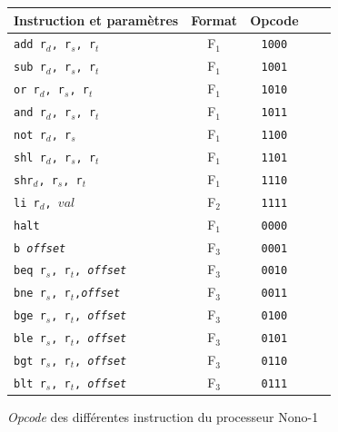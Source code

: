\documentclass[a4paper]{article}
\begin{document}
			\begin{figure}
			\centering
			\begin{tabular}{|p{4cm}|c|c|c|c|}
				\hline Instruction et paramètres & Format & Opcode  \\ 
				\hline \texttt{add r$_{d}$, r$_{s}$, r$_{t}$} & F$_{1}$ & \texttt{1000} \\ 
				\hline \texttt{sub r$_{d}$, r$_{s}$, r$_{t}$} & F$_{1}$ & \texttt{1001}  \\ 
				\hline \texttt{or r$_{d}$, r$_{s}$, r$_{t}$} & F$_{1}$ & \texttt{1010}  \\ 
				\hline \texttt{and r$_{d}$, r$_{s}$, r$_{t}$} & F$_{1}$ & \texttt{1011}  \\ 
				\hline \texttt{not r$_{d}$, r$_{s}$} & F$_{1}$ & \texttt{1100} \\ 
				\hline \texttt{shl r$_{d}$, r$_{s}$, r$_{t}$} & F$_{1}$ & \texttt{1101} \\ 
				\hline \texttt{shr$_{d}$, r$_{s}$, r$_{t}$} & F$_{1}$ & \texttt{1110} \\ 
				\hline \texttt{li r$_{d}$, $val$} & F$_{2}$ & \texttt{1111} \\ 
				\hline \texttt{halt} & F$_{1}$ & \texttt{0000} \\ 
				\hline \texttt{b \textit{offset}} & F$_{3}$ & \texttt{0001} \\
				\hline \texttt{beq r$_{s}$, r$_{t}$, \textit{offset}} & F$_{3}$ & \texttt{0010} \\ 
				\hline \texttt{bne r$_{s}$, r$_{t}$,\textit{offset}} & F$_{3}$ & \texttt{0011} \\ 
				\hline \texttt{bge r$_{s}$, r$_{t}$, \textit{offset}} & F$_{3}$ & \texttt{0100} \\ 
				\hline \texttt{ble r$_{s}$, r$_{t}$, \textit{offset}} & F$_{3}$ & \texttt{0101} \\ 
				\hline \texttt{bgt r$_{s}$, r$_{t}$, \textit{offset}} & F$_{3}$ & \texttt{0110} \\ 
				\hline \texttt{blt r$_{s}$, r$_{t}$, \textit{offset}} & F$_{3}$ & \texttt{0111} \\ 
				\hline 
				\end{tabular}
			\label{tab_opcode}
			\caption{\textit{Opcode} des différentes instruction du processeur Nono-1}
			\end{figure}
			
\end{document}
